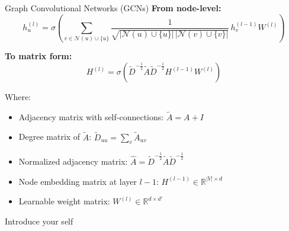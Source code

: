 \documentclass[aspectratio=169]{beamer}
\renewcommand{\alert}[1]{\textbf{\color{swufe}#1}}
\begin{document}
        \begin{frame}{Graph Convolutional Networks (GCNs)}
            \alert{From node-level:}
            \begin{equation}
                h_u^{(l)} = \sigma\left(\sum_{v \in \mathcal{N}(u) \cup \{u\}} \frac{1}{\sqrt{|\mathcal{N}(u) \cup \{u\}| \, |\mathcal{N}(v) \cup \{v\}|}}\, h_v^{(l-1)} W^{(l)}\right)
            \end{equation}

            \alert{To matrix form:}
            \begin{equation}
                H^{(l)} = \sigma\left(\tilde{D}^{-\frac{1}{2}}\tilde{A}\tilde{D}^{-\frac{1}{2}}H^{(l-1)} W^{(l)}\right)
            \end{equation}

            Where:
            \begin{itemize}
                \item Adjacency matrix with self-connections: $\tilde{A} = A + I$
                \item Degree matrix of $\tilde{A}$: $\tilde{D}_{uu} = \sum_v \tilde{A}_{uv}$
                \item Normalized adjacency matrix: $\hat{A} = \tilde{D}^{-\frac{1}{2}}\tilde{A}\tilde{D}^{-\frac{1}{2}}$
                \item Node embedding matrix at layer $l-1$: $H^{(l-1)} \in \mathbb{R}^{|V| \times d}$
                \item Learnable weight matrix: $W^{(l)} \in \mathbb{R}^{d \times d'}$
            \end{itemize}

            \begin{note}
                {Introduce your self}
            \end{note}
        \end{frame}
\end{document}
